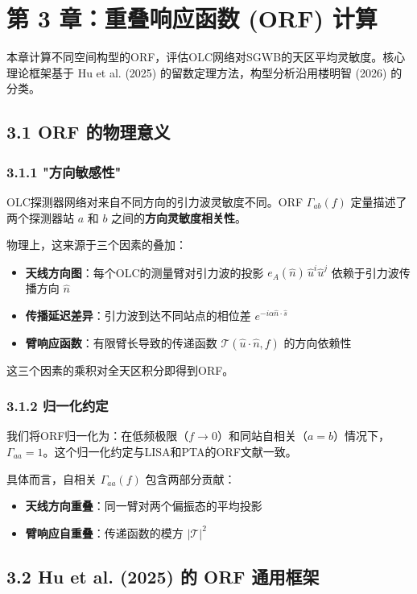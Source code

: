 \documentclass[12pt,a4paper]{article}
\begin{document}
\section{第 3 章：重叠响应函数 (ORF) 计算}


本章计算不同空间构型的ORF，评估OLC网络对SGWB的天区平均灵敏度。核心理论框架基于 Hu et al. (2025) 的留数定理方法\cite{ref9}，构型分析沿用楼明智 (2026) 的分类\cite{ref10}。

\subsection{3.1 ORF 的物理意义}


\subsubsection{3.1.1 "方向敏感性"}


OLC探测器网络对来自不同方向的引力波灵敏度不同。ORF $\Gamma_{ab}(f)$ 定量描述了两个探测器站 $a$ 和 $b$ 之间的\textbf{方向灵敏度相关性}。

物理上，这来源于三个因素的叠加：
\begin{itemize}
  \item[1] \textbf{天线方向图}：每个OLC的测量臂对引力波的投影 $e_A(\hat{n})\, \hat{u}^i \hat{u}^j$ 依赖于引力波传播方向 $\hat{n}$
  \item[2] \textbf{传播延迟差异}：引力波到达不同站点的相位差 $e^{-i\alpha \hat{n}\cdot\hat{s}}$
  \item[3] \textbf{臂响应函数}：有限臂长导致的传递函数 $\mathcal{T}(\hat{u}\cdot\hat{n}, f)$ 的方向依赖性\end{itemize}
这三个因素的乘积对全天区积分即得到ORF。
\subsubsection{3.1.2 归一化约定}


我们将ORF归一化为：在低频极限（$f \to 0$）和同站自相关（$a = b$）情况下，$\Gamma_{aa} = 1$。这个归一化约定与LISA和PTA的ORF文献一致。

具体而言，自相关 $\Gamma_{aa}(f)$ 包含两部分贡献：
\begin{itemize}
  \item \textbf{天线方向重叠}：同一臂对两个偏振态的平均投影
  \item \textbf{臂响应自重叠}：传递函数的模方 $|\mathcal{T}|^2$
\end{itemize}
\subsection{3.2 Hu et al. (2025) 的 ORF 通用框架}
\end{document}

